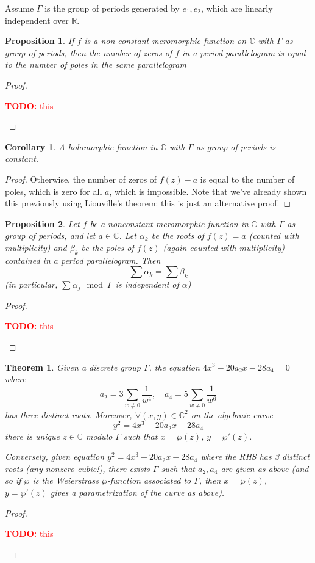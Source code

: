 \documentclass{article}
\newtheorem{theorem}{Theorem}
\newtheorem{corollary}{Corollary}
\newcommand{\mbb}[1]{\mathbb{#1}}
\newcommand{\reals}{\mbb{R}}
\newtheorem{proposition}{Proposition}
\newcommand{\TODO}[1]{\begin{center}\huge{\textcolor{red}{\textbf{TODO:} #1}}\end{center}}
\begin{document}
Assume \(\Gamma\) is the group of periods generated by \(e_1, e_2\), which are linearly independent over \(\reals\).
\begin{proposition}
If \(f\) is a non-constant meromorphic function on \(\mbb{C}\) with \(\Gamma\) as group of periods, then the number of zeros of \(f\) in a period parallelogram is equal to the number of poles in the same parallelogram
\end{proposition}
\begin{proof}
\TODO{this}
\end{proof}
\begin{corollary}
A holomorphic function in \(\mbb{C}\) with \(\Gamma\) as group of periods is constant.
\end{corollary}
\begin{proof}
Otherwise, the number of zeros of \(f(z) - a\) is equal to the number of poles, which is zero for all \(a\), which is impossible. Note that we've already shown this previously using Liouville's theorem: this is just an alternative proof.
\end{proof}
\begin{proposition}
Let \(f\) be a nonconstant meromorphic function in \(\mbb{C}\) with \(\Gamma\) as group of periods, and let \(a \in \mbb{C}\). Let \(\alpha_k\) be the roots of \(f(z) = a\) (counted with multiplicity) and \(\beta_k\) be the poles of \(f(z)\) (again counted with multiplicity) contained in a period parallelogram. Then
\[\sum\alpha_k = \sum\beta_k\]
(in particular, \(\sum\alpha_j \mod \Gamma\) is independent of \(\alpha\))
\end{proposition}
\begin{proof}
\TODO{this}
\end{proof}
\begin{theorem}
Given a discrete group \(\Gamma\), the equation \(4x^3 - 20a_2x - 28a_4 = 0\) where
\[a_2 = 3\sum_{w \neq 0}\frac{1}{w^4}, \quad a_4 = 5\sum_{w \neq 0}\frac{1}{w^6}\]
has three distinct roots. Moreover, \(\forall (x, y) \in \mbb{C}^2\) on the algebraic curve
\[y^2 = 4x^3 - 20a_2x - 28a_4\]
there is unique \(z \in \mbb{C}\) modulo \(\Gamma\) such that \(x = \wp(z)\), \(y = \wp'(z)\).

Conversely, given equation \(y^2 = 4x^3 - 20a_2x - 28a_4\) where the RHS has 3 distinct roots (any nonzero cubic!), there exists \(\Gamma\) such that \(a_2, a_4\) are given as above (and so if \(\wp\) is the Weierstrass \(\wp\)-function associated to \(\Gamma\), then \(x = \wp(z)\), \(y = \wp'(z)\) gives a parametrization of the curve as above).
\end{theorem}
\begin{proof}
\TODO{this}
\end{proof}
\end{document}
